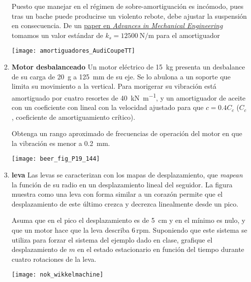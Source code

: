 \documentclass[11pt, spanish, a4paper, twopage]{article}
\begin{document}
\begin{enumerate}
\begin{minipage}[t][6cm]{0.65\textwidth}
	Puesto que manejar en el régimen de sobre-amortiguación es incómodo, pues tras un bache puede producirse un violento rebote, debe ajustar la suspensión en consecuencia.
	De un \href{https://journals.sagepub.com/doi/pdf/10.1177/1687814016648638}{paper en \emph{Advances in Mechanical Engineering}} tomamos un valor estándar de $k_s = \SI{12500}{\newton\per\metre}$ para el amortiguador
\end{minipage}
\begin{minipage}[c][0cm][t]{0.3\textwidth}
	\texttt{[image: amortiguadores\_AudiCoupeTT]}
\end{minipage}



\item 
	\begin{minipage}[t][3.5cm]{0.75\textwidth}
	\textbf{Motor desbalanceado}
	Un motor eléctrico de \SI{15}{\kilo\gram} presenta un desbalance de su carga de \SI{20}{\gram} a \SI{125}{\milli\metre} de su eje.
	Se lo abulona a un soporte que limita su movimiento a la vertical.
	Para morigerar su vibración está amortiguado por cuatro resortes de \SI{40}{\kilo\newton\per\metre}, y un amortiguador de aceite con un coeficiente con lineal con la velocidad ajustado para que $c = 0.4 C_c$ ($C_c$, coeficiente de amortiguamiento crítico).

	Obtenga un rango aproximado de frecuencias de operación del motor en que la vibración es menor a \SI{0.2}{\milli\metre}.
\end{minipage}
\begin{minipage}[c][2cm][t]{0.2\textwidth}
	\texttt{[image: beer\_fig\_P19\_144]}
\end{minipage}



\item
\begin{minipage}[t][3.5cm]{0.75\textwidth}
	\textbf{leva}
	Las levas se caracterizan con los mapas de desplazamiento, que \emph{mapean} la función de su radio en un desplazamiento lineal del seguidor.
	La figura muestra como una leva con forma similar a un corazón permite que el desplazamiento de este último crezca y decrezca linealmente desde un pico.
				
	Asuma que en el pico el desplazamiento es de \SI{5}{\centi\metre} y en el mínimo es nulo, y que un motor hace que la leva describa $6\,\mathrm{rpm}$.  
	Suponiendo que este sistema se utiliza para forzar el sistema del ejemplo dado en clase, grafique el desplazamiento de $m$ en el estado estacionario en función del tiempo durante cuatro rotaciones de la leva.
\end{minipage}
\begin{minipage}[c][2cm][t]{0.2\textwidth}
	\texttt{[image: nok\_wikkelmachine]}
\end{minipage}




\end{enumerate}
\end{document}

